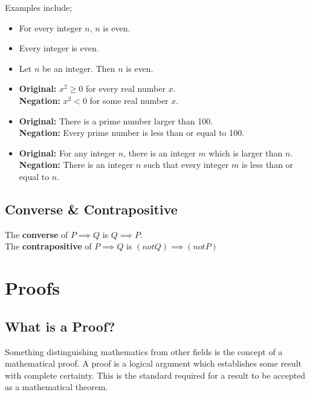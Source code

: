 \documentclass{report}
\newenvironment{frameblack}[1][Black]
  {\begin{tcolorbox}[colframe=#1,colback=white]}
  {\end{tcolorbox}}
\begin{document}
Examples include;
\begin{itemize}
\item For every integer $n$, $n$ is even.
\item Every integer is even.
\item Let $n$ be an integer. Then $n$ is even.
\end{itemize}

\begin{frameblack}
    \begin{itemize}
        \item \textbf{Original:} $x^2 \geq 0$ for every real number $x$.\\
        \textbf{Negation:} $x^2 < 0$ for some real number $x$.\\
        \item \textbf{Original:} There is a prime number larger than 100.\\
        \textbf{Negation:} Every prime number is less than or equal to 100.\\
        \item \textbf{Original:} For any integer $n$, there is an integer $m$ which is larger than $n$.\\
        \textbf{Negation:} There is an integer $n$ such that every integer $m$ is less than or equal to $n$.
    \end{itemize}
\end{frameblack}

\section{Converse \& Contrapositive}

The \textbf{converse} of $P \implies Q$ is $Q \implies P$.\\
The \textbf{contrapositive} of $P \implies Q$ is $(not Q) \implies (not P)$

\chapter{Proofs}
\section{What is a Proof?}

Something distinguishing mathematics from other fields is the concept of a mathematical proof. A proof is a logical argument which establishes some result with complete certainty. This is the standard required for a result to be accepted as a mathematical theorem.
\end{document}
